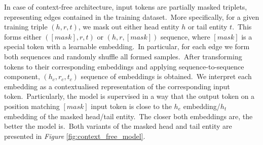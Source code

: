 \documentclass[longabstract, english, mgr]{iithesis}
\theoremstyle{default_theorem_style}\newtheorem{theorem}{Theorem}
\theoremstyle{default_theorem_style}\newtheorem{definition}{Definition}
\begin{document}
\noindent In case of context-free architecture, input tokens are partially masked triplets, representing edges
contained in the training dataset.\ More specifically, for a given training triple $(h, r, t)$, we mask out either head
entity $h$ or tail entity $t$.\ This forms either $([mask], r, t)$ or $(h, r, [mask])$ sequence, where $[mask]$ is a
special token with a learnable embedding.\ In particular, for each edge we form both sequences and randomly shuffle all
formed samples.\ After transforming tokens to their corresponding embeddings and applying sequence-to-sequence
component, $(h_c, r_c, t_c)$ sequence of embeddings is obtained.\ We interpret each embedding as a contextualised
representation of the corresponding input token.\ Particularly, the model is supervised in a way that the output token
on a position matching $[mask]$ input token is close to the $h_e$ embedding/$h_t$ embedding of the masked head/tail
entity.\ The closer both embeddings are, the better the model is.\ Both variants of the masked head and tail entity
are presented in \textit{Figure} \ref{fig:context_free_model}.
\end{document}

